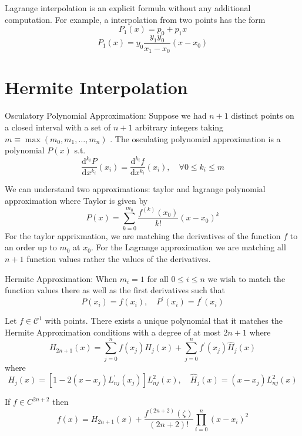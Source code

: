 \begin{remark}
    Lagrange interpolation is an explicit formula without any additional computation. For example, a interpolation from two points
    has the form 
    \[
        P_1 (x) = p_0 + p_1 x
    \]
    \[
        P_1(x) = y_0 \frac{y_1 y_0}{x_1 - x_0} (x- x_0)
    \]
\end{remark}

\section{Hermite Interpolation}
\begin{definition}
    Osculatory Polynomial Approximation: Suppose we had \(n+1\) distinct points on a closed interval with a set of \(n+1\) arbitrary integers taking
    \(m \equiv \max (m_0,m_1, \dots ,m_n)\) . The osculating polynomial approximation is a polynomial \(P(x)\) s.t. 
    \[
        \frac{\mathrm{d}^{k_i} P}{\mathrm{d}x^{k_i}} (x_i) = 
        \frac{\mathrm{d}^{k_i} f}{\mathrm{d}x^{k_i}}(x_i) , \quad \forall 0 \leq  k_i \leq  m
    \]
\end{definition}
We can understand two approximations: taylor and lagrange polynomial approximation where Taylor is given by 
\[
    P(x) = \sum_{k=0}^{m_0} \frac{f^(k)(x_0)}{k!}(x-x_{0} )^k
\]
For the taylor apprixmation, we are matching the derivatives of the function \(f\) to an order up to \(m_0\) at \(x_0\). For the 
Lagrange approximation we are matching all \(n+1\) function values rather the values of the derivatives. 
\begin{definition}
    Hermite Approximation: When \(m_i = 1\)  for all \(0 \leq  i \leq  n\) we wish to match the function values there 
    as well as the first derivatives such that 
    \[
        P(x_i) = f(x_i), \quad P^{\prime} (x_i) = f^{\prime} (x_i)
    \]
\end{definition}    

\begin{theorem}
    Let \(f \in \mathcal{C}^1\) with points. There exists a unique polynomial that it matches the Hermite Approximation conditions with a degree 
    of at most \(2n+1\) where
    \[
        H_{2n+1}  (x) = \sum_{j=0}^{n} f(x_j) H_j(x) + \sum_{j=0}^{n} f^{\prime} (x_j) \hat{H} _j (x)
    \]
    where 
    \[
        H_j(x) = \left[  1- 2(x-x_j)L^{\prime}_{nj} (x_j) \right] L^{2}_{nj} (x), \quad
        \hat{H} _j(x) = (x- x_j)L^{2}_{nj} (x)
    \]
\end{theorem}
\begin{theorem}
    If \(f \in C^{2n+2} \) then 
    \[
        f(x) = H_{2n+1}(x) + 
        \frac{f^{(2n+2)} (\zeta)}{(2n+2)!} \prod_{i=0}^n (x-x_i)^{2}  
    \]
\end{theorem}